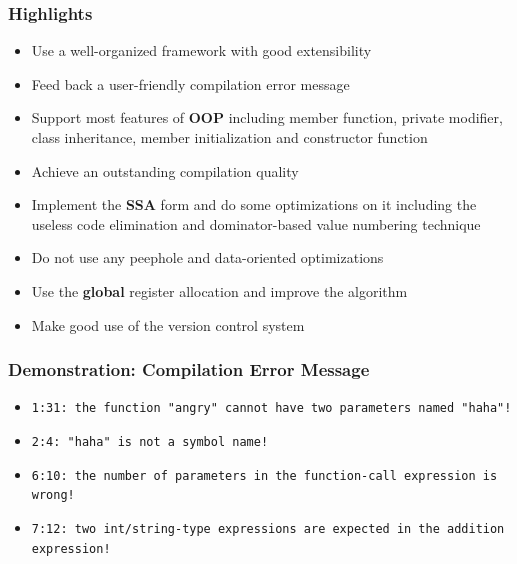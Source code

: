 \documentclass{beamer}
\begin{document}
	\begin{frame}
		\frametitle{Highlights}
		\begin{itemize}
			\item Use a well-organized framework with good extensibility
			\item Feed back a user-friendly compilation error message
			\item<0-0> Support most features of \textbf{OOP} including member function, private modifier, class inheritance, member initialization and constructor function
			\item<0-0> Achieve an outstanding compilation quality
			\item<0-0> Implement the \textbf{SSA} form and do some optimizations on it including the useless code elimination and dominator-based value numbering technique
			\item<0-0> Do not use any peephole and data-oriented optimizations
			\item<0-0> Use the \textbf{global} register allocation and improve the algorithm
			\item<0-0> Make good use of the version control system
		\end{itemize}
	\end{frame}

	\begin{frame}
		\frametitle{Demonstration: Compilation Error Message}
		\begin{itemize}
			\item \texttt{1:31: the function "angry" cannot have two parameters named "haha"!}
			\item \texttt{2:4: "haha" is not a symbol name!}
			\item \texttt{6:10: the number of parameters in the function-call expression is wrong!}
			\item \texttt{7:12: two int/string-type expressions are expected in the addition expression!}
		\end{itemize}
	\end{frame}
\end{document}
